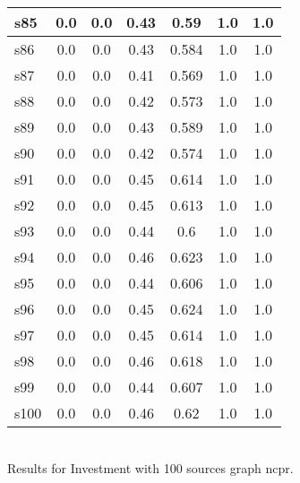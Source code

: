 \documentclass{article}
\begin{document}
\begin{tabular}{|l|c|c|c|c|c|c|}
\hline
s85 &0.0 & 0.0 & 0.43 & 0.59 & 1.0 & 1.0\\
\hline
s86 &0.0 & 0.0 & 0.43 & 0.584 & 1.0 & 1.0\\
\hline
s87 &0.0 & 0.0 & 0.41 & 0.569 & 1.0 & 1.0\\
\hline
s88 &0.0 & 0.0 & 0.42 & 0.573 & 1.0 & 1.0\\
\hline
s89 &0.0 & 0.0 & 0.43 & 0.589 & 1.0 & 1.0\\
\hline
s90 &0.0 & 0.0 & 0.42 & 0.574 & 1.0 & 1.0\\
\hline
s91 &0.0 & 0.0 & 0.45 & 0.614 & 1.0 & 1.0\\
\hline
s92 &0.0 & 0.0 & 0.45 & 0.613 & 1.0 & 1.0\\
\hline
s93 &0.0 & 0.0 & 0.44 & 0.6 & 1.0 & 1.0\\
\hline
s94 &0.0 & 0.0 & 0.46 & 0.623 & 1.0 & 1.0\\
\hline
s95 &0.0 & 0.0 & 0.44 & 0.606 & 1.0 & 1.0\\
\hline
s96 &0.0 & 0.0 & 0.45 & 0.624 & 1.0 & 1.0\\
\hline
s97 &0.0 & 0.0 & 0.45 & 0.614 & 1.0 & 1.0\\
\hline
s98 &0.0 & 0.0 & 0.46 & 0.618 & 1.0 & 1.0\\
\hline
s99 &0.0 & 0.0 & 0.44 & 0.607 & 1.0 & 1.0\\
\hline
s100 &0.0 & 0.0 & 0.46 & 0.62 & 1.0 & 1.0\\
\hline
\end{tabular}\\

\noindent Results for Investment with 100 sources graph ncpr.
\end{document}
